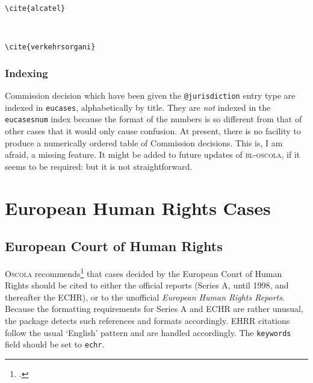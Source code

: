 \documentclass[a4paper,
               11pt,
	       DIV=1,			   
	       footinclude=false]
	      {scrartcl}
\newcommand{\oscola}{\textsc{bl-oscola}}
\newcommand{\egcite}[1]{{\texttt{\textbackslash cite#1}}}
\begin{document}
\begin{description}
\item[\egcite{\{alcatel\}}] \cite{alcatel} \\
\item[\egcite{\{verkehrsorgani\}}] \cite{verkehrsorgani}
\end{description}



\subsubsection{Indexing}

Commission decision which have been given the \texttt{@jurisdiction}
entry type are indexed in \texttt{eucases}, alphabetically by
title. They are \emph{not} indexed in the \texttt{eucasesnum} index
because the format of the numbers is so different from that of other
cases that it would only cause confusion. At present, there is no
facility to produce a numerically ordered table of Commission
decisions. This is, I am afraid, a missing feature. It might be added
to future updates of \oscola, if it seems to be required: but it is
not straightforward.


\section{European Human Rights Cases}

\subsection{European Court of Human Rights}

\textsc{Oscola} recommends\footcite[31]{oscola} that cases decided by the
European Court of Human Rights should be cited to either the official
reports (Series A, until 1998, and thereafter the ECHR), or to the
unofficial \emph{European Human Rights Reports}. Because the
formatting requirements for Series A and ECHR are rather unusual, the
package detects such references and formats accordingly. EHRR
citations follow the usual `English' pattern and are handled
accordingly. The \texttt{keywords} field should be set to \texttt{echr}.
\end{document}
